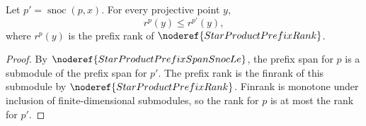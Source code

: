 \begin{lemma}
Let \(p'=\operatorname{snoc}(p,x)\).  For every projective point \(y\),
\[
  r^p(y)\le r^{p'}(y),
\]
where \(r^p(y)\) is the prefix rank of \(\noderef{StarProductPrefixRank}\).
\end{lemma}
\begin{proof}
By \(\noderef{StarProductPrefixSpanSnocLe}\), the prefix span for \(p\) is a
submodule of the prefix span for \(p'\).  The prefix rank is the finrank of
this submodule by \(\noderef{StarProductPrefixRank}\).  Finrank is monotone
under inclusion of finite-dimensional submodules, so the rank for \(p\) is at
most the rank for \(p'\).
\end{proof}
